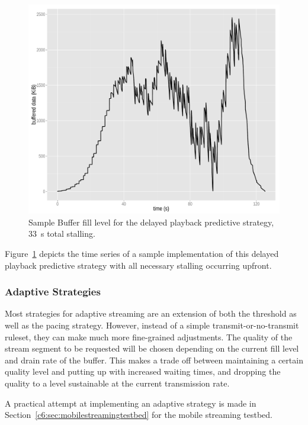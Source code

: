 \begin{figure}[htb]
	\centering
	\includegraphics[width=1.0\textwidth]{images/R-bufferlevel-startdelay.pdf}
	\caption{Sample Buffer fill level for the delayed playback predictive strategy, \SI{33}{\second} total stalling.}
\label{c3:fig:bufferlevel-startdelay}
\end{figure}

Figure~\ref{c3:fig:bufferlevel-startdelay} depicts the time series of a sample implementation of this delayed playback predictive strategy with all necessary stalling occurring upfront.


\subsubsection{Adaptive Strategies}

Most strategies for adaptive streaming are an extension of both the threshold as well as the pacing strategy. However, instead of a simple transmit-or-no-transmit ruleset, they can make much more fine-grained adjustments. The quality of the stream segment to be requested will be chosen depending on the current fill level and drain rate of the buffer. This makes a trade off between maintaining a certain quality level and putting up with increased waiting times, and dropping the quality to a level sustainable at the current transmission rate.

A practical attempt at implementing an adaptive strategy is made in Section~\ref{c6:sec:mobilestreamingtestbed} for the mobile streaming testbed.


